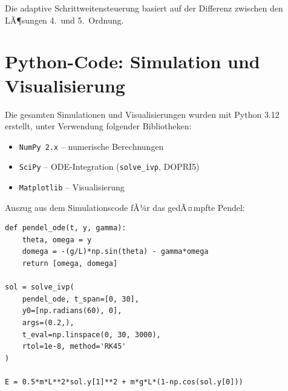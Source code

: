 ﻿\documentclass[12pt, a4paper]{report}
\theoremstyle{definition}
\theoremstyle{remark}
\begin{document}
Die adaptive Schrittweitensteuerung basiert auf der Differenz zwischen den
LÃ¶sungen 4.\ und 5.\ Ordnung.

\chapter{Python-Code: Simulation und Visualisierung}
\label{app:code}

Die gesamten Simulationen und Visualisierungen wurden mit Python 3.12 erstellt,
unter Verwendung folgender Bibliotheken:

\begin{itemize}
  \item \texttt{NumPy 2.x} -- numerische Berechnungen
  \item \texttt{SciPy} -- ODE-Integration (\texttt{solve\_ivp}, DOPRI5)
  \item \texttt{Matplotlib} -- Visualisierung
\end{itemize}

Auszug aus dem Simulationscode fÃ¼r das gedÃ¤mpfte Pendel:

\begin{verbatim}
def pendel_ode(t, y, gamma):
    theta, omega = y
    domega = -(g/L)*np.sin(theta) - gamma*omega
    return [omega, domega]

sol = solve_ivp(
    pendel_ode, t_span=[0, 30],
    y0=[np.radians(60), 0],
    args=(0.2,),
    t_eval=np.linspace(0, 30, 3000),
    rtol=1e-8, method='RK45'
)

E = 0.5*m*L**2*sol.y[1]**2 + m*g*L*(1-np.cos(sol.y[0]))
\end{verbatim}
\end{document}

